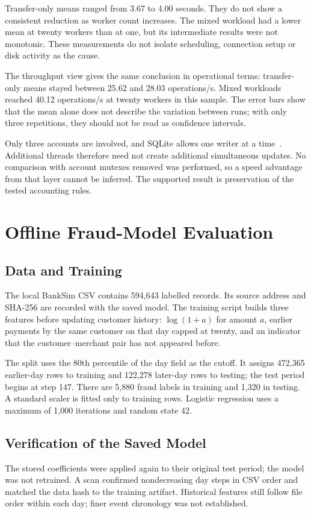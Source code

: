 \documentclass[conference]{IEEEtran}
\begin{document}
Transfer-only means ranged from 3.67 to 4.00 seconds. They do not show a consistent reduction as worker count increases. The mixed workload had a lower mean at twenty workers than at one, but its intermediate results were not monotonic. These measurements do not isolate scheduling, connection setup or disk activity as the cause.

The throughput view gives the same conclusion in operational terms: transfer-only means stayed between 25.62 and 28.03 operations/s. Mixed workloads reached 40.12 operations/s at twenty workers in this sample. The error bars show that the mean alone does not describe the variation between runs; with only three repetitions, they should not be read as confidence intervals.

Only three accounts are involved, and SQLite allows one writer at a time~\cite{sqlite}. Additional threads therefore need not create additional simultaneous updates. No comparison with account mutexes removed was performed, so a speed advantage from that layer cannot be inferred. The supported result is preservation of the tested accounting rules.

\section{Offline Fraud-Model Evaluation}
\subsection{Data and Training}
The local BankSim CSV contains 594,643 labelled records. Its source address and SHA-256 are recorded with the saved model. The training script builds three features before updating customer history: $\log(1+a)$ for amount $a$, earlier payments by the same customer on that day capped at twenty, and an indicator that the customer--merchant pair has not appeared before.

The split uses the 80th percentile of the day field as the cutoff. It assigns 472,365 earlier-day rows to training and 122,278 later-day rows to testing; the test period begins at step 147. There are 5,880 fraud labels in training and 1,320 in testing. A standard scaler is fitted only to training rows. Logistic regression uses a maximum of 1,000 iterations and random state 42.

\subsection{Verification of the Saved Model}
The stored coefficients were applied again to their original test period; the model was not retrained. A scan confirmed nondecreasing day steps in CSV order and matched the data hash to the training artifact. Historical features still follow file order within each day; finer event chronology was not established.
\end{document}
